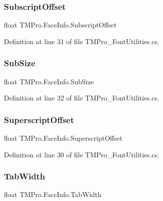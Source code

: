 \subsubsection{\texorpdfstring{SubscriptOffset}{SubscriptOffset}}
{\footnotesize\ttfamily float T\+M\+Pro.\+Face\+Info.\+Subscript\+Offset}



Definition at line 31 of file T\+M\+Pro\+\_\+\+Font\+Utilities.\+cs.

\mbox{\label{class_t_m_pro_1_1_face_info_ad6ea70a93cce8776697ec907c5b8ede2}} 
\subsubsection{\texorpdfstring{SubSize}{SubSize}}
{\footnotesize\ttfamily float T\+M\+Pro.\+Face\+Info.\+Sub\+Size}



Definition at line 32 of file T\+M\+Pro\+\_\+\+Font\+Utilities.\+cs.

\mbox{\label{class_t_m_pro_1_1_face_info_a938e5a3d334a261aba7eb0c4d571493c}} 
\subsubsection{\texorpdfstring{SuperscriptOffset}{SuperscriptOffset}}
{\footnotesize\ttfamily float T\+M\+Pro.\+Face\+Info.\+Superscript\+Offset}



Definition at line 30 of file T\+M\+Pro\+\_\+\+Font\+Utilities.\+cs.

\mbox{\label{class_t_m_pro_1_1_face_info_a05d6a8a6e72fceefc77d70a61b3ecf8c}} 
\subsubsection{\texorpdfstring{TabWidth}{TabWidth}}
{\footnotesize\ttfamily float T\+M\+Pro.\+Face\+Info.\+Tab\+Width}



